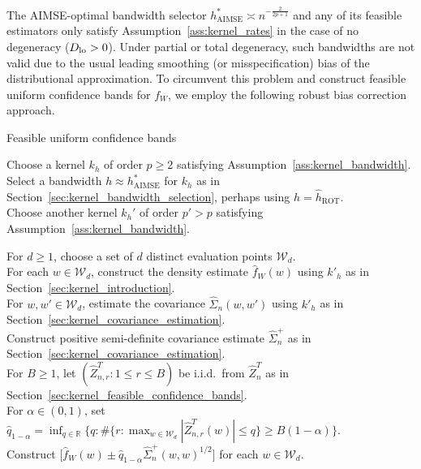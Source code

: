 \documentclass[11pt,lof]{puthesis}
\newcommand{\R}{\ensuremath{\mathbb{R}}}
\newcommand{\cW}{\ensuremath{\mathcal{W}}}
\newcommand{\Dl}{\ensuremath{D_{\textup{lo}}}}
\DeclareMathOperator{\AIMSE}{AIMSE}
\DeclareMathOperator{\ROT}{ROT}
\theoremstyle{break}
\theoremstyle{proof}
\begin{document}
The AIMSE-optimal bandwidth selector $h^*_{\AIMSE}\asymp n^{-\frac{2}{2p+1}}$
and any of its feasible estimators only satisfy
Assumption~\ref{ass:kernel_rates} in
the case of no degeneracy ($\Dl>0$). Under partial or total degeneracy, such
bandwidths are not valid due to the usual leading smoothing (or
misspecification) bias of the distributional approximation. To circumvent this
problem and construct feasible uniform confidence bands for $f_W$, we employ
the following robust bias correction approach.

\begin{algorithm}[b!]
\caption{Feasible uniform confidence bands}
\label{alg:kernel_method}

Choose a kernel $k_h$ of order $p \geq 2$ satisfying
Assumption~\ref{ass:kernel_bandwidth}. \\

Select a bandwidth $h \approx h^*_{\AIMSE}$ for $k_h$
as in Section~\ref{sec:kernel_bandwidth_selection},
perhaps using $h = \hat{h}_{\ROT}$. \\

Choose another kernel $k_h'$ of order $p'>p$ satisfying
Assumption~\ref{ass:kernel_bandwidth}.

For $d \geq 1$, choose a set of $d$ distinct evaluation points $\cW_d$. \\

For each $w \in \cW_d$, construct the density estimate $\hat f_W(w)$
using $k'_{h}$ as in Section~\ref{sec:kernel_introduction}. \\

For $w, w' \in \cW_d$, estimate the covariance $\hat \Sigma_n(w,w')$
using $k'_{h}$ as in Section~\ref{sec:kernel_covariance_estimation}. \\

Construct positive semi-definite
covariance estimate $\hat \Sigma_n^+$
as in Section~\ref{sec:kernel_covariance_estimation}. \\

For $B \geq 1$, let $(\hat Z_{n,r}^T: 1\leq r\leq B)$ be i.i.d.\
from $\hat{Z}_n^T$ as in Section~\ref{sec:kernel_feasible_confidence_bands}.
\\

For $\alpha \in (0,1)$, set
$\hat q_{1-\alpha} = \inf_{q \in \R}
\{ q : \# \{r: \max_{w\in\cW_d}|\hat Z_{n,r}^T(w)| \leq q \}
\geq B(1-\alpha) \}$. \\

Construct $ \big[\hat f_W(w) \pm
\hat q_{1-\alpha} \hat\Sigma_n^+(w,w)^{1/2} \big]$ for each $w \in \cW_d$.
%
\end{algorithm}
\end{document}
